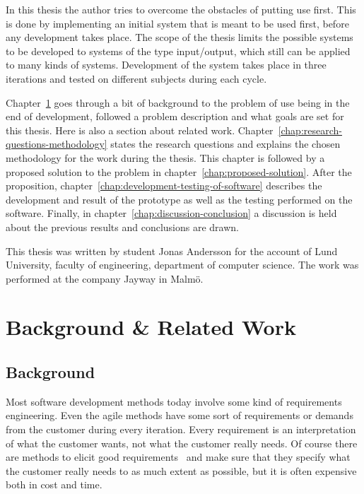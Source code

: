 \documentclass[a4paper]{report}
\begin{document}
In this thesis the author tries to overcome the obstacles of putting use first. This is done by implementing an initial system that is meant to be used first, before any development takes place. The scope of the thesis limits the possible systems to be developed to systems of the type input/output, which still can be applied to many kinds of systems. Development of the system takes place in three iterations and tested on different subjects during each cycle. 

Chapter~\ref{chap:background-related-work} goes through a bit of background to the problem of use being in the end of development, followed a problem description and what goals are set for this thesis. Here is also a section about related work. Chapter~\ref{chap:research-questions-methodology} states the research questions and explains the chosen methodology for the work during the thesis. This chapter is followed by a proposed solution to the problem in chapter~\ref{chap:proposed-solution}. After the proposition, chapter~\ref{chap:development-testing-of-software} describes the development and result of the prototype as well as the testing performed on the software. Finally, in chapter~\ref{chap:discussion-conclusion} a discussion is held about the previous results and conclusions are drawn.

This thesis was written by student Jonas Andersson for the account of Lund University, faculty of engineering, department of computer science. The work was performed at the company Jayway in Malmö.

\chapter{Background \& Related Work} \label{chap:background-related-work}

\section{Background}
Most software development methods today involve some kind of requirements engineering. Even the agile methods have some sort of requirements or demands from the customer during every iteration. Every requirement is an interpretation of what the customer wants, not what the customer really needs. Of course there are methods to elicit good requirements~\cite{Lauesen:2002} and make sure that they specify what the customer really needs to as much extent as possible, but it is often expensive both in cost and time.
\end{document}
